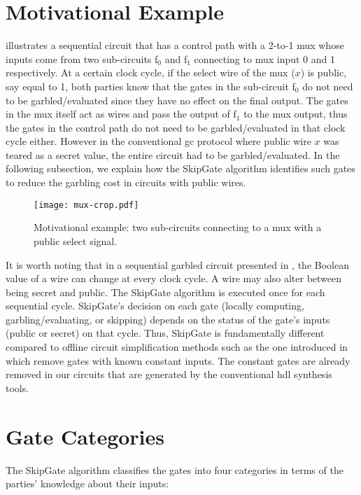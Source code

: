 \section{Motivational Example}\label{sec:skipgate-motiv}
 illustrates a sequential circuit that has a control path with a 2-to-1 \acrshort{mux} whose inputs come from two sub-circuits f$_0$ and f$_1$ connecting to \acrshort{mux} input 0 and 1 respectively.
At a certain clock cycle, if the select wire of the \acrshort{mux} ($x$) is public, say equal to 1, both parties know that the gates in the sub-circuit f$_0$ do not need to be garbled/evaluated since they have no effect on the final output.
The gates in the \acrshort{mux} itself act as wires and pass the output of f$_1$ to the \acrshort{mux} output, thus the gates in the control path do not need to be garbled/evaluated in that clock cycle either.
However in the conventional \acrshort{gc} protocol where public wire $x$ was teared as a secret value, the entire circuit had to be garbled/evaluated.
In the following subsection, we explain how the SkipGate algorithm identifies such gates to reduce the garbling cost in circuits with public wires.

\begin{figure}[h]
    \centering
    \texttt{[image: mux-crop.pdf]}
    \caption{Motivational example: two sub-circuits connecting to a \acrshort{mux} with a public select signal.}
\label{fig:mux}
\end{figure}

It is worth noting that in a sequential garbled circuit presented in , the Boolean value of a wire can change at every clock cycle.
A wire may also alter between being secret and public.
The SkipGate algorithm is executed once for each sequential cycle.
SkipGate's decision on each gate (locally computing, garbling/evaluating, or skipping) depends on the status of the gate's inputs (public or secret) on that cycle.
Thus, SkipGate is fundamentally different compared to offline circuit simplification methods such as the one introduced in~\cite{pinkas2009secure} which remove gates with known constant inputs.
The constant gates are already removed in our circuits that are generated by the conventional \acrshort{hdl} synthesis tools.

\section{Gate Categories}\label{sec:skipgate-cat}
The SkipGate algorithm classifies the gates into four categories in terms of the parties' knowledge about their inputs:

